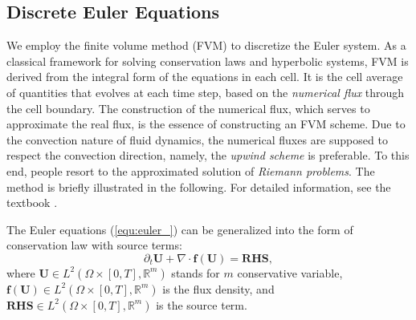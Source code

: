 \documentclass{article}
\begin{document}
\subsection{Discrete Euler Equations}
We employ the finite volume method (FVM) to discretize the Euler system. As a classical framework for solving conservation laws and hyperbolic systems, FVM is derived from the integral form of the equations in each cell. It is the cell average of quantities that evolves at each time step, based on the \emph{numerical flux} through the cell boundary. The construction of the numerical flux, which serves to approximate the real flux, is the essence of constructing an FVM scheme. Due to the convection nature of fluid dynamics, the numerical fluxes are supposed to respect the convection direction, namely, the \emph{upwind scheme} is preferable. To this end, people resort to the approximated solution of \emph{Riemann problems}. The method is briefly illustrated in the following. For detailed information, see the textbook \cite{leveque_2002}.

The Euler equations (\ref{equ:euler_}) can be generalized into the form of conservation law with source terms:
\begin{equation} \label{equ:euler_conservation}
    \partial_t \mathbf{U} + \nabla \cdot \mathbf{f}(\mathbf{U}) = \mathbf{RHS},
\end{equation}
where $\mathbf{U} \in L^2(\Omega \times [0,T], \mathbb{R}^m)$ stands for $m$ conservative variable, $\mathbf{f}(\mathbf{U}) \in L^2(\Omega \times  [0,T], \mathbb{R}^m)$ is the flux density, and $\mathbf{RHS} \in L^2(\Omega \times  [0,T], \mathbb{R}^m)$ is the source term. 
\end{document}
